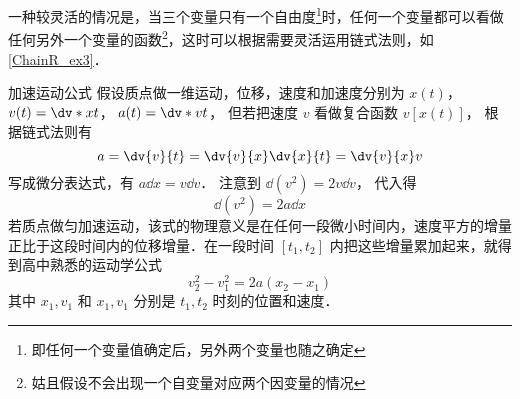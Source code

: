 一种较灵活的情况是，当三个变量只有一个自由度\footnote{即任何一个变量值确定后，另外两个变量也随之确定}时，任何一个变量都可以看做任何另外一个变量的函数\footnote{姑且假设不会出现一个自变量对应两个因变量的情况}，这时可以根据需要灵活运用链式法则，如\autoref{ChainR_ex3}．

\begin{exam}{加速运动公式}\label{ChainR_ex3}
假设质点做一维运动，位移，速度和加速度分别为 $x(t)$，  $v(t) = \dv*{x}{t}$，  $a(t) = \dv*{v}{t}$， 但若把速度 $v$ 看做复合函数 $v[x(t)]$， 根据链式法则有
\begin{equation}
a = \dv{v}{t} = \dv{v}{x}\dv{x}{t} = \dv{v}{x}v
\end{equation}
写成微分表达式，有 $a\dd{x} = v\dd{v}$． 注意到 $\dd (v^2) = 2v\dd{v}$， 代入得
\begin{equation}
\dd(v^2) = 2a \dd{x}
\end{equation}
若质点做匀加速运动，该式的物理意义是在任何一段微小时间内，速度平方的增量正比于这段时间内的位移增量．在一段时间 $[t_1,t_2]$ 内把这些增量累加起来，就得到高中熟悉的运动学公式
\begin{equation}
v_2^2-v_1^2 = 2a(x_2-x_1)
\end{equation}
其中 $x_1,v_1$ 和 $x_1,v_1$ 分别是 $t_1,t_2$ 时刻的位置和速度．
\end{exam}
